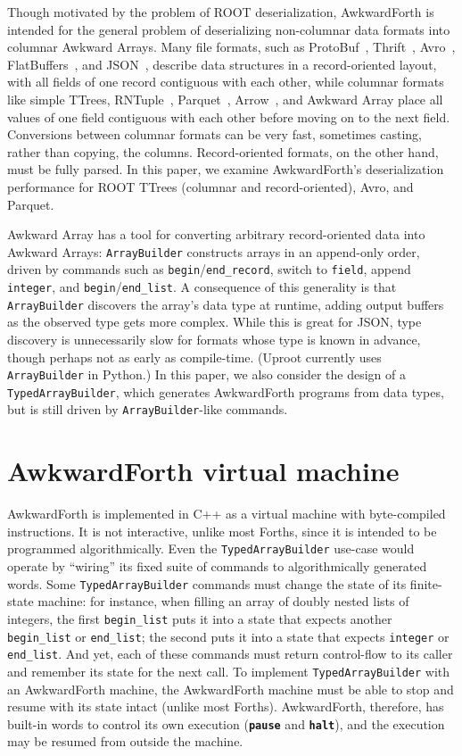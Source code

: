 \documentclass{webofc}
\begin{document}
Though motivated by the problem of ROOT deserialization, AwkwardForth is intended for the general problem of deserializing non-columnar data formats into columnar Awkward Arrays. Many file formats, such as ProtoBuf~\cite{protobuf}, Thrift~\cite{thrift}, Avro~\cite{avro}, FlatBuffers~\cite{flatbuffers}, and JSON~\cite{json}, describe data structures in a record-oriented layout, with all fields of one record contiguous with each other, while columnar formats like simple TTrees, RNTuple~\cite{rntuple}, Parquet~\cite{parquet}, Arrow~\cite{arrow}, and Awkward Array place all values of one field contiguous with each other before moving on to the next field. Conversions between columnar formats can be very fast, sometimes casting, rather than copying, the columns. Record-oriented formats, on the other hand, must be fully parsed. In this paper, we examine AwkwardForth's deserialization performance for ROOT TTrees (columnar and record-oriented), Avro, and Parquet.

Awkward Array has a tool for converting arbitrary record-oriented data into Awkward Arrays: {\tt ArrayBuilder} constructs arrays in an append-only order, driven by commands such as {\tt begin}/{\tt end\_record}, switch to {\tt field}, append {\tt integer}, and {\tt begin}/{\tt end\_list}. A consequence of this generality is that {\tt ArrayBuilder} discovers the array's data type at runtime, adding output buffers as the observed type gets more complex. While this is great for JSON, type discovery is unnecessarily slow for formats whose type is known in advance, though perhaps not as early as compile-time. (Uproot currently uses {\tt ArrayBuilder} in Python.) In this paper, we also consider the design of a {\tt TypedArrayBuilder}, which generates AwkwardForth programs from data types, but is still driven by {\tt ArrayBuilder}-like commands.

\section{AwkwardForth virtual machine}

AwkwardForth is implemented in C++ as a virtual machine with byte-compiled instructions. It is not interactive, unlike most Forths, since it is intended to be programmed algorithmically. Even the {\tt TypedArrayBuilder} use-case would operate by ``wiring'' its fixed suite of commands to algorithmically generated words. Some {\tt TypedArrayBuilder} commands must change the state of its finite-state machine: for instance, when filling an array of doubly nested lists of integers, the first {\tt begin\_list} puts it into a state that expects another {\tt begin\_list} or {\tt end\_list}; the second puts it into a state that expects {\tt integer} or {\tt end\_list}. And yet, each of these commands must return control-flow to its caller and remember its state for the next call. To implement {\tt TypedArrayBuilder} with an AwkwardForth machine, the AwkwardForth machine must be able to stop and resume with its state intact (unlike most Forths). AwkwardForth, therefore, has built-in words to control its own execution (\textcolor{OliveGreen}{\tt\textbf{pause}} and \textcolor{OliveGreen}{\tt\textbf{halt}}), and the execution may be resumed from outside the machine.
\end{document}
